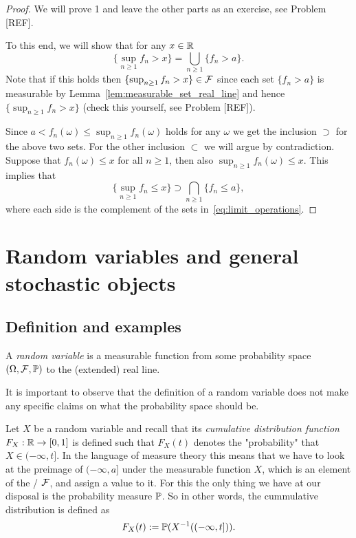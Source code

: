 \begin{proof}
We will prove 1 and leave the other parts as an exercise, see Problem [REF]. 

To this end, we will show that for any $x \in \mathbb R$
\begin{equation}\label{eq:limit_operations}
	\{\sup_{n \ge 1} f_n > x\} = \bigcup_{n \ge 1} \{f_n > a\}.
\end{equation}
Note that if this holds then $\{\sup_{n \ge 1} f_n > x\} \in \mathcal F$ since each set $\{f_n > a\}$ is measurable by Lemma~\ref{lem:measurable_set_real_line} and hence $\{\sup_{n \ge 1} f_n > x\}$ (check this yourself, see Problem [REF]).

Since $a < f_n(\omega) \le \sup_{n \ge 1} f_n(\omega)$ holds for any $\omega$ we get the inclusion $\supset$ for the above two sets. For the other inclusion $\subset$ we will argue by contradiction. Suppose that $f_n(\omega) \le x$ for all $n \ge 1$, then also $\sup_{n \ge 1} f_n(\omega) \le x$. This implies that
\[
	\{\sup_{n \ge 1} f_n \le x\} \supset \bigcap_{n \ge 1} \{f_n \le a\},
\] 
where each side is the complement of the sets in~\eqref{eq:limit_operations}.

\end{proof}

\section{Random variables and general stochastic objects}\label{sec:random_variables}


\subsection{Definition and examples}

\begin{definition}
A \emph{random variable} is a measurable function from some probability space $(\Omega,\mathcal F, \mathbb P)$ to the (extended) real line.
\end{definition}

It is important to observe that the definition of a random variable does not make any specific claims on what the probability space should be. 

Let $X$ be a random variable and recall that its \emph{cumulative distribution function} $F_X : \mathbb R \to [0,1]$ is defined such that $F_X(t)$ denotes the "probability" that $X \in (-\infty ,t]$. In the language of measure theory this means that we have to look at the preimage of $(-\infty, a]$ under the measurable function $X$, which is an element of the \sigalg/ $\mathcal F$, and assign a value to it. For this the only thing we have at our disposal is the probability measure $\mathbb P$. So in other words, the cummulative distribution is defined as
\[
	F_X(t) := \mathbb P(X^{-1}((-\infty,t])).
\]

